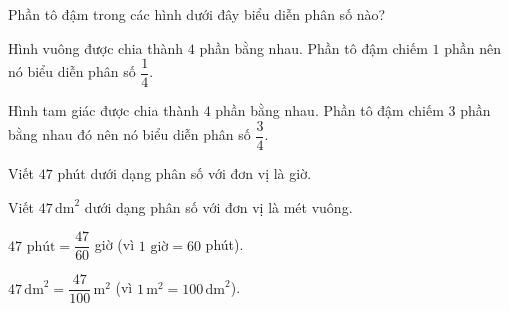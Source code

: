\begin{vd}%
 Phần tô đậm trong các hình dưới đây biểu diễn phân số nào?
 \begin{center}
  \hspace{1.5cm}
 \end{center}
 \loigiai
  {
  \begin{enumEX}{1}
   \item Hình vuông được chia thành $4$ phần bằng nhau. Phần tô đậm chiếm $1$ phần nên nó biểu diễn phân số $\dfrac{1}{4}$.
   \item Hình tam giác được chia thành $4$ phần bằng nhau. Phần tô đậm chiếm $3$ phần bằng nhau đó nên nó biểu diễn phân số $\dfrac{3}{4}$.
  \end{enumEX}
  }
\end{vd}

\begin{vd}%
 \textrm{}
 \begin{enumEX}{1}
  \item Viết $47$ phút dưới dạng phân số với đơn vị là giờ.
  \item Viết $47 \mathrm{\,dm}^2$ dưới dạng phân số với đơn vị là mét vuông.
 \end{enumEX}
 \loigiai
  {
  \begin{enumEX}{1}
   \item $47 \text{ phút}=\dfrac{47}{60}$ giờ (vì $1 \text{ giờ}=60$ phút).
   \item $47 \mathrm{\,dm}^2=\dfrac{47}{100} \mathrm{\,m}^2$ (vì $1 \mathrm{\,m}^2=100\mathrm{\,dm}^2$).
  \end{enumEX}
  }
\end{vd}

